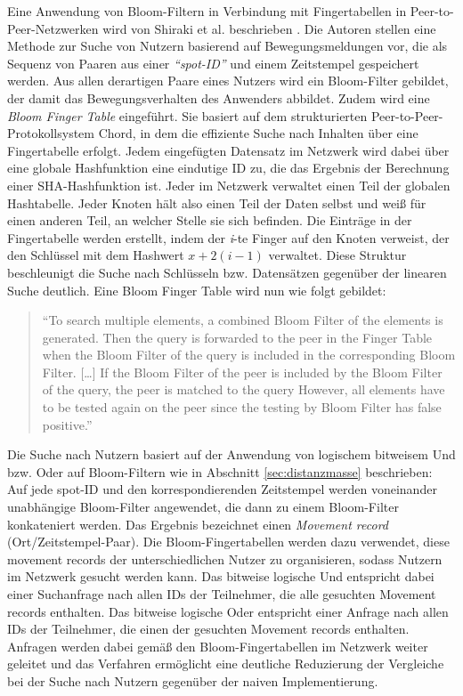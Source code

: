 Eine Anwendung von Bloom-Filtern in Verbindung mit Fingertabellen in Peer-to-Peer-Netzwerken wird von Shiraki et al. beschrieben \cite{Shiraki2009}. Die Autoren stellen eine Methode zur Suche von Nutzern basierend auf Bewegungsmeldungen vor, die als Sequenz von Paaren aus einer \textit{"`spot-ID"'} und einem Zeitstempel gespeichert werden. Aus allen derartigen Paare eines Nutzers wird ein Bloom-Filter gebildet, der damit das Bewegungsverhalten des Anwenders abbildet. Zudem wird eine \textit{Bloom Finger Table} eingeführt. Sie basiert auf dem strukturierten Peer-to-Peer-Protokollsystem Chord, in dem die effiziente Suche nach Inhalten über eine Fingertabelle erfolgt. Jedem eingefügten Datensatz im Netzwerk wird dabei über eine globale Hashfunktion eine eindutige ID zu, die das Ergebnis der Berechnung einer SHA-Hashfunktion ist. Jeder im Netzwerk verwaltet einen Teil der globalen Hashtabelle. Jeder Knoten hält also einen Teil der Daten selbst und weiß für einen anderen Teil, an welcher Stelle sie sich befinden. Die Einträge in der Fingertabelle werden erstellt, indem der \textit{i}-te Finger auf den Knoten verweist, der den Schlüssel mit dem Hashwert $x+2(i-1)$ verwaltet. Diese Struktur beschleunigt die Suche nach Schlüsseln bzw. Datensätzen gegenüber der linearen Suche deutlich. Eine Bloom Finger Table wird nun wie folgt gebildet: 
\begin{quote}
"`To search multiple elements, a combined Bloom Filter of the elements is generated. Then the query is forwarded to the peer in the Finger Table when the Bloom Filter of the query is included in the corresponding Bloom Filter. [\dots] If the Bloom Filter of the peer is included by the Bloom Filter of the query, the peer is matched to the query However, all elements have to be tested again on the peer since the testing by Bloom Filter has false positive."' \cite{Shiraki2009}
\end{quote}

Die Suche nach Nutzern basiert auf der Anwendung von logischem bitweisem Und bzw. Oder auf Bloom-Filtern wie in Abschnitt \ref{sec:distanzmasse} beschrieben: Auf jede spot-ID und den korrespondierenden Zeitstempel werden voneinander unabhängige Bloom-Filter angewendet, die dann zu einem Bloom-Filter konkateniert werden. Das Ergebnis bezeichnet einen \textit{Movement record} (Ort/Zeitstempel-Paar). Die Bloom-Fingertabellen werden dazu verwendet, diese movement records der unterschiedlichen Nutzer zu organisieren, sodass Nutzern im Netzwerk gesucht werden kann. Das bitweise logische Und entspricht dabei einer Suchanfrage nach allen IDs der Teilnehmer, die alle gesuchten Movement records enthalten. Das bitweise logische Oder entspricht einer Anfrage nach allen IDs der Teilnehmer, die einen der gesuchten Movement records enthalten. Anfragen werden dabei gemäß den Bloom-Fingertabellen im Netzwerk weiter geleitet und das Verfahren ermöglicht eine deutliche Reduzierung der Vergleiche bei der Suche nach Nutzern gegenüber der naiven Implementierung. 

